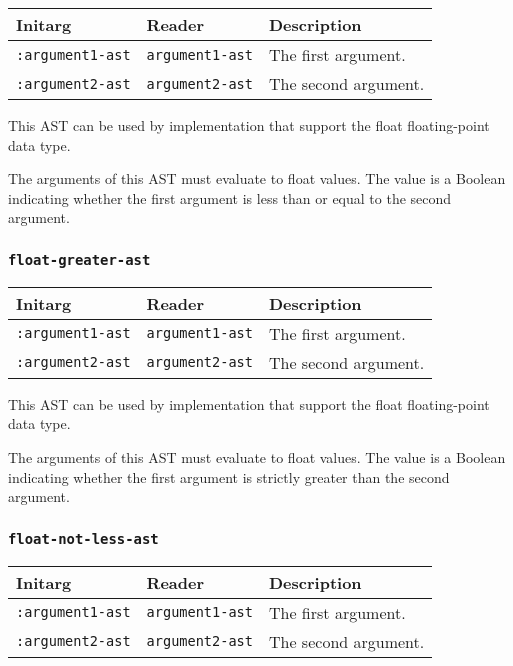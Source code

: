 \begin{tabular}{|l|l|l|}
\hline
Initarg & Reader & Description\\
\hline\hline
\texttt{:argument1-ast} & \texttt{argument1-ast} & The first argument.\\
\hline
\texttt{:argument2-ast} & \texttt{argument2-ast} & The second argument.\\
\hline
\end{tabular}

This AST can be used by implementation that support the float
floating-point data type.

The arguments of this AST must evaluate to float
values.  The value is a Boolean indicating whether the first argument
is less than or equal to the second argument.

\subsubsection{\texttt{float-greater-ast}}
\label{sec-ast-float-greater}

\begin{tabular}{|l|l|l|}
\hline
Initarg & Reader & Description\\
\hline\hline
\texttt{:argument1-ast} & \texttt{argument1-ast} & The first argument.\\
\hline
\texttt{:argument2-ast} & \texttt{argument2-ast} & The second argument.\\
\hline
\end{tabular}

This AST can be used by implementation that support the float
floating-point data type.

The arguments of this AST must evaluate to float
values.  The value is a Boolean indicating whether the first argument
is strictly greater than the second argument.

\subsubsection{\texttt{float-not-less-ast}}
\label{sec-ast-float-not-less}

\begin{tabular}{|l|l|l|}
\hline
Initarg & Reader & Description\\
\hline\hline
\texttt{:argument1-ast} & \texttt{argument1-ast} & The first argument.\\
\hline
\texttt{:argument2-ast} & \texttt{argument2-ast} & The second argument.\\
\hline
\end{tabular}

